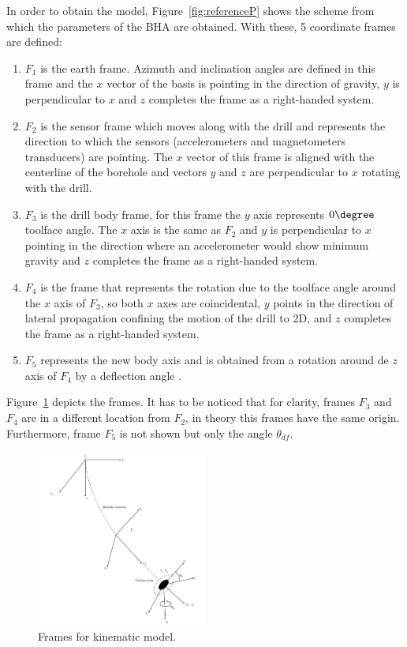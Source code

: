 In order to obtain the model, Figure~\ref{fig:referenceP} shows the scheme from which the parameters of the \acs{BHA} are obtained. With these, 5 coordinate frames  are defined:

\begin{enumerate}
	\item $F_1$ is the earth frame. Azimuth and inclination angles are defined in this frame and the $x$ vector of the basis is pointing in the direction of gravity, $y$ is perpendicular to $x$ and $z$ completes the frame as a right-handed system.
	\item $F_2$ is the sensor frame which moves along with the drill and represents the direction to which the sensors (accelerometers and magnetometers transducers) are pointing. The $x$ vector of this frame is aligned with the centerline of the borehole and vectors $y$ and $z$ are perpendicular to $x$ rotating with the drill.
	\item $F_3$ is the drill body frame, for this frame the $y$ axis represents $0\degree$ toolface angle. The $x$ axis is the same as $F_2$ and $y$ is perpendicular to $x$ pointing in the direction where an accelerometer would show minimum gravity and $z$ completes the frame as a right-handed system.
	\item $F_4$ is the frame that represents the rotation due to the toolface angle around the $x$ axis of $F_3$, so both $x$ axes are coincidental, $y$ points in the direction of lateral propagation confining the motion of the drill to 2D, and $z$ completes the frame as a right-handed system.
	\item $F_5$ represents the new body axis and is obtained from a rotation around de $z$ axis of $F_4$ by a deflection angle .
\end{enumerate}

Figure~\ref{fig:Frames} depicts the frames. It has to be noticed that for clarity, frames $F_3$ and $F_4$ are in a different location from $F_2$, in theory this frames have the same origin. Furthermore, frame $F_5$ is not shown but only the angle $\theta_{df}$.

\begin{figure}[ht]\centering
	\includegraphics[width=0.5\textwidth]{img/FramesPanchal.pdf}
	\caption{\label{fig:Frames}Frames for kinematic model.}
\end{figure}

